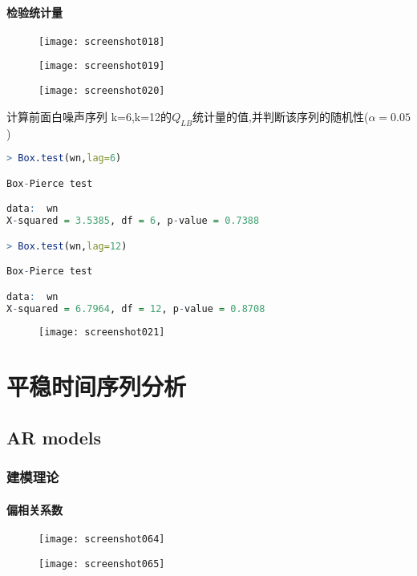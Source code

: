 \documentclass[11pt,a4paper,oneside]{book}
\begin{document}
\subsection{检验统计量}

\begin{figure}[H]
	\texttt{[image: screenshot018]}
	\label{fig:screenshot018}
\end{figure}
\begin{figure}[H]
	\texttt{[image: screenshot019]}
	\label{fig:screenshot019}
\end{figure}
\begin{figure}[H]
	\texttt{[image: screenshot020]}
	\label{fig:screenshot020}
\end{figure}

计算前面白噪声序列 k=6,k=12的$Q_{LB}$统计量的值,并判断该序列的随机性($ \alpha=0.05 $)
\begin{lstlisting}[language=r]
> Box.test(wn,lag=6)

Box-Pierce test

data:  wn
X-squared = 3.5385, df = 6, p-value = 0.7388

> Box.test(wn,lag=12)

Box-Pierce test

data:  wn
X-squared = 6.7964, df = 12, p-value = 0.8708
\end{lstlisting}
\begin{figure}[H]
	\texttt{[image: screenshot021]}
	\label{fig:screenshot021}
\end{figure}


\part{平稳时间序列分析}
\chapter{AR models}
\section{建模理论}
\subsection{偏相关系数}
\begin{figure}[H]
	\texttt{[image: screenshot064]}
	\label{fig:screenshot064}
\end{figure}
\begin{figure}[H]
	\texttt{[image: screenshot065]}
	\label{fig:screenshot065}
\end{figure}
\end{document}
